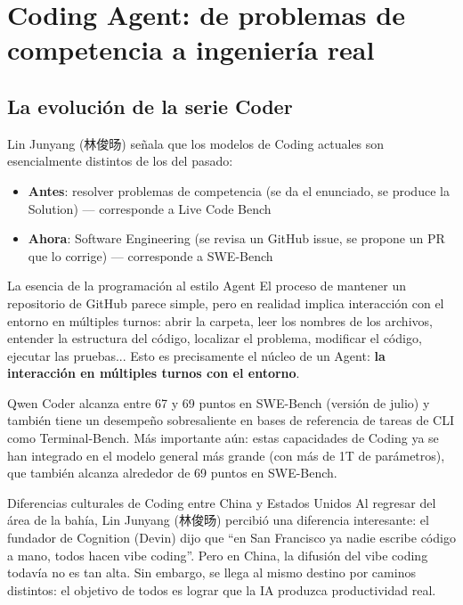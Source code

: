 \section{Coding Agent: de problemas de competencia a ingeniería real}

\subsection{La evolución de la serie Coder}

Lin Junyang (林俊旸) señala que los modelos de Coding actuales son esencialmente distintos de los del pasado:

\begin{itemize}
    \item \textbf{Antes}: resolver problemas de competencia (se da el enunciado, se produce la Solution) — corresponde a Live Code Bench
    \item \textbf{Ahora}: Software Engineering (se revisa un GitHub issue, se propone un PR que lo corrige) — corresponde a SWE-Bench
\end{itemize}

\begin{importantbox}{La esencia de la programación al estilo Agent}
El proceso de mantener un repositorio de GitHub parece simple, pero en realidad implica interacción con el entorno en múltiples turnos: abrir la carpeta, leer los nombres de los archivos, entender la estructura del código, localizar el problema, modificar el código, ejecutar las pruebas... Esto es precisamente el núcleo de un Agent: \textbf{la interacción en múltiples turnos con el entorno}.
\end{importantbox}

Qwen Coder alcanza entre 67 y 69 puntos en SWE-Bench (versión de julio) y también tiene un desempeño sobresaliente en bases de referencia de tareas de CLI como Terminal-Bench. Más importante aún: estas capacidades de Coding ya se han integrado en el modelo general más grande (con más de 1T de parámetros), que también alcanza alrededor de 69 puntos en SWE-Bench.

\begin{knowledgebox}{Diferencias culturales de Coding entre China y Estados Unidos}
Al regresar del área de la bahía, Lin Junyang (林俊旸) percibió una diferencia interesante: el fundador de Cognition (Devin) dijo que ``en San Francisco ya nadie escribe código a mano, todos hacen vibe coding''. Pero en China, la difusión del vibe coding todavía no es tan alta. Sin embargo, se llega al mismo destino por caminos distintos: el objetivo de todos es lograr que la IA produzca productividad real.
\end{knowledgebox}

